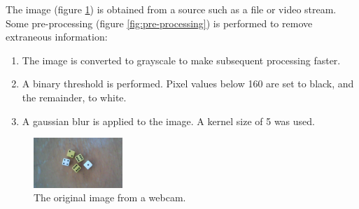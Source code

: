 \documentclass[conference]{IEEEtran}
\begin{document}
The image (figure \ref{fig:original}) is obtained from a source such as a file or video stream.
Some pre-processing (figure \ref{fig:pre-processing}) is performed to remove extraneous information:
\begin{enumerate}
	\item The image is converted to grayscale to make subsequent processing faster. 
	\item A binary threshold is performed. Pixel values below 160 are set to black, and the remainder, to white.
	\item A gaussian blur is applied to the image. A kernel size of 5 was used.
\end{enumerate}
\begin{figure}
	\centering
	\includegraphics[width=0.3\textwidth]{original}
	\caption{The original image from a webcam.}
	\label{fig:original}
\end{figure}
%
%
%
\end{document}
